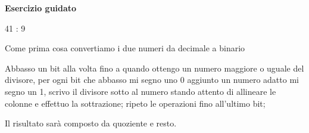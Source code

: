 \documentclass[11pt,fleqn]{book}
\begin{document}
\begin{esercizio}[1]
    \textbf{Esercizio guidato}

    41 : 9

    Come prima cosa convertiamo i due numeri da decimale a binario

    \immediate{}
    

    \immediate{}
    

    Abbasso un bit alla volta fino a quando ottengo un numero maggiore o uguale del divisore, per ogni bit che abbasso mi segno uno 0 aggiunto un numero adatto mi segno un 1, scrivo il divisore sotto al numero stando attento di allineare le colonne e effettuo la sottrazione; ripeto le operazioni fino all'ultimo bit; 
    
    Il risultato sarà composto da quoziente e resto.

    \immediate{}
    
\end{esercizio}

\newpage







\end{document}
